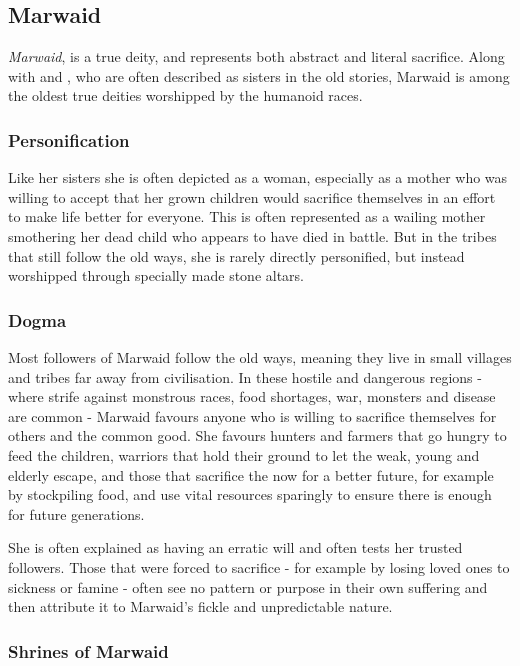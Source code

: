 \subsection{Marwaid}
\label{sec:Marwaid}

\emph{Marwaid}, is a true deity, and represents both abstract and literal
sacrifice. Along with  and , who are
often described as sisters in the old stories, Marwaid is among the oldest
true deities worshipped by the humanoid races.

\subsubsection{Personification}

Like her sisters she is often depicted as a woman, especially as a mother who
was willing to accept that her grown children would sacrifice themselves in an
effort to make life better for everyone. This is often represented as a
wailing mother smothering her dead child who appears to have died in
battle. But in the tribes that still follow the old ways, she is rarely
directly personified, but instead worshipped through specially made stone
altars.

\subsubsection{Dogma}

Most followers of Marwaid follow the old ways, meaning they live in small
villages and tribes far away from civilisation. In these hostile and dangerous
regions - where strife against monstrous races, food shortages, war, monsters
and disease are common - Marwaid favours anyone who is willing to sacrifice
themselves for others and the common good. She favours hunters and farmers
that go hungry to feed the children, warriors that hold their ground to let
the weak, young and elderly escape, and those that sacrifice the now for a
better future, for example by stockpiling food, and use vital resources
sparingly to ensure there is enough for future generations.

She is often explained as having an erratic will and often tests her trusted
followers. Those that were forced to sacrifice - for example by losing loved
ones to sickness or famine - often see no pattern or purpose in their own
suffering and then attribute it to Marwaid's fickle and unpredictable nature.

\subsubsection{Shrines of Marwaid}

